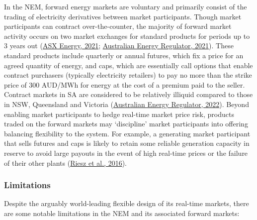 \documentclass[12pt,a4paper,]{report}
\begin{document}
In the NEM, forward energy markets are voluntary and primarily consist
of the trading of electricity derivatives between market participants.
Though market participants can contract over-the-counter, the majority
of forward market activity occurs on two market exchanges for standard
products for periods up to 3 years out
(\protect\hyperlink{ref-asxenergyAustralianElectricityMarket2021}{ASX
Energy, 2021};
\protect\hyperlink{ref-australianenergyregulatorStateEnergyMarket2021}{Australian
Energy Regulator, 2021}). These standard products include quarterly or
annual futures, which fix a price for an agreed quantity of energy, and
caps, which are essentially call options that enable contract purchasers
(typically electricity retailers) to pay no more than the strike price
of 300 AUD/MWh for energy at the cost of a premium paid to the seller.
Contract markets in SA are considered to be relatively illiquid compared
to those in NSW, Queensland and Victoria
(\protect\hyperlink{ref-australianenergyregulatorStateEnergyMarket2022}{Australian
Energy Regulator, 2022}). Beyond enabling market participants to hedge
real-time market price risk, products traded on the forward markets may
`discipline' market participants into offering balancing flexibility to
the system. For example, a generating market participant that sells
futures and caps is likely to retain some reliable generation capacity
in reserve to avoid large payouts in the event of high real-time prices
or the failure of their other plants
(\protect\hyperlink{ref-rieszAssessingViabilityEnergyonly2016}{Riesz et
al., 2016}).

\hypertarget{limitations}{%
\subsubsection{Limitations}\label{limitations}}

Despite the arguably world-leading flexible design of its real-time
markets, there are some notable limitations in the NEM and its
associated forward markets:
\end{document}
